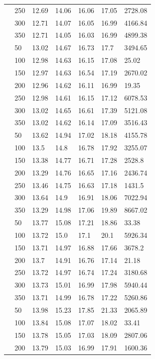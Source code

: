 \documentclass[12pt,a4paper,twoside,openany]{report}
\begin{document}
\begin{longtable}{@{} l l l l l l l @{}}
& 250 & 12.69 & 14.06 & 16.06 & 17.05 & 2728.08 \\
& 300 & 12.71 & 14.07 & 16.05 & 16.99 & 4166.84 \\
& 350 & 12.71 & 14.05 & 16.03 & 16.99 & 4899.38 \\
\hline
\pagebreak[4]
40 & 50 & 13.02 & 14.67 & 16.73 & 17.7 & 3494.65 \\
& 100 & 12.98 & 14.63 & 16.15 & 17.08 & 25.02 \\
& 150 & 12.97 & 14.63 & 16.54 & 17.19 & 2670.02 \\
& 200 & 12.96 & 14.62 & 16.11 & 16.99 & 19.35 \\
& 250 & 12.98 & 14.61 & 16.15 & 17.12 & 6078.53 \\
& 300 & 13.02 & 14.65 & 16.61 & 17.39 & 5121.08 \\
& 350 & 13.02 & 14.62 & 16.14 & 17.09 & 3516.43 \\
\hline
\pagebreak[2]
50 & 50 & 13.62 & 14.94 & 17.02 & 18.18 & 4155.78 \\
& 100 & 13.5 & 14.8 & 16.78 & 17.92 & 3255.07 \\
& 150 & 13.38 & 14.77 & 16.71 & 17.28 & 2528.8 \\
& 200 & 13.29 & 14.76 & 16.65 & 17.16 & 2436.74 \\
& 250 & 13.46 & 14.75 & 16.63 & 17.18 & 1431.5 \\
& 300 & 13.64 & 14.9 & 16.91 & 18.06 & 7022.94 \\
& 350 & 13.29 & 14.98 & 17.06 & 19.89 & 8667.02 \\
\hline
\pagebreak[3]
60 & 50 & 13.77 & 15.08 & 17.21 & 18.86 & 33.38 \\
& 100 & 13.72 & 15.0 & 17.1 & 20.1 & 5926.34 \\
& 150 & 13.71 & 14.97 & 16.88 & 17.66 & 3678.2 \\
& 200 & 13.7 & 14.91 & 16.76 & 17.14 & 21.18 \\
& 250 & 13.72 & 14.97 & 16.74 & 17.24 & 3180.68 \\
& 300 & 13.73 & 15.01 & 16.99 & 17.98 & 5940.44 \\
& 350 & 13.71 & 14.99 & 16.78 & 17.22 & 5260.86 \\
\hline
\pagebreak[3]
70 & 50 & 13.98 & 15.23 & 17.85 & 21.33 & 2065.89 \\
& 100 & 13.84 & 15.08 & 17.07 & 18.02 & 33.41 \\
& 150 & 13.78 & 15.05 & 17.03 & 18.09 & 2807.06 \\
& 200 & 13.79 & 15.03 & 16.99 & 17.91 & 1600.36 \\

\end{longtable}
\end{document}
